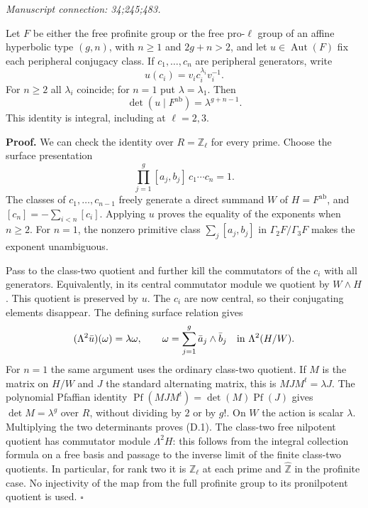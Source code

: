 \documentclass[10pt,a4paper]{article}
\begin{document}
\emph{Manuscript connection: 34;245;483.}

\nopagebreak[4]

Let \(F\) be either the free profinite group or the free pro-\(\ell\) group of an affine hyperbolic type \((g,n)\), with \(n\geq1\) and \(2g+n>2\), and let \(u\in\operatorname{Aut}(F)\) fix each peripheral conjugacy class. If \(c_1,\ldots,c_n\) are peripheral generators, write \[
 u(c_i)=v_i c_i^{\lambda_i}v_i^{-1}.
\] For \(n\geq2\) all \(\lambda_i\) coincide; for \(n=1\) put \(\lambda=\lambda_1\). Then \[
 \det(u\mid F^{\mathrm{ab}})=\lambda^{g+n-1}. \tag{D.1}
\] This identity is integral, including at \(\ell=2,3\).

\textbf{Proof.} We can check the identity over \(R=\mathbb Z_\ell\) for every prime. Choose the surface presentation \[
 \prod_{j=1}^{g}[a_j,b_j]\,c_1\cdots c_n=1.
\] The classes of \(c_1,\ldots,c_{n-1}\) freely generate a direct summand \(W\) of \(H=F^{\mathrm{ab}}\), and \([c_n]=-\sum_{i<n}[c_i]\). Applying \(u\) proves the equality of the exponents when \(n\geq2\). For \(n=1\), the nonzero primitive class \(\sum_j[a_j,b_j]\) in \(\Gamma_2F/\Gamma_3F\) makes the exponent unambiguous.

Pass to the class-two quotient and further kill the commutators of the \(c_i\) with all generators. Equivalently, in its central commutator module we quotient by \(W\wedge H\). This quotient is preserved by \(u\). The \(c_i\) are now central, so their conjugating elements disappear. The defining surface relation gives \[
 (\Lambda^2\bar u)(\omega)=\lambda\omega,
 \qquad \omega=\sum_{j=1}^{g}\bar a_j\wedge\bar b_j
 \quad\hbox{in }\Lambda^2(H/W).
\] For \(n=1\) the same argument uses the ordinary class-two quotient. If \(M\) is the matrix on \(H/W\) and \(J\) the standard alternating matrix, this is \(MJM^t=\lambda J\). The polynomial Pfaffian identity \(\operatorname{Pf}(MJM^t)=\det(M)\operatorname{Pf}(J)\) gives \(\det M=\lambda^g\) over \(R\), without dividing by \(2\) or by \(g!\). On \(W\) the action is scalar \(\lambda\). Multiplying the two determinants proves (D.1). The class-two free nilpotent quotient has commutator module \(\Lambda^2H\): this follows from the integral collection formula on a free basis and passage to the inverse limit of the finite class-two quotients. In particular, for rank two it is \(\mathbb Z_\ell\) at each prime and \(\widehat{\mathbb Z}\) in the profinite case. No injectivity of the map from the full profinite group to its pronilpotent quotient is used. \(\square\)

\end{document}

